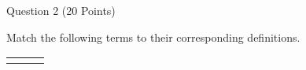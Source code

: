 \documentclass{article}
\begin{document}

\vspace{2cm}


\begin{minipage}{\textwidth}
    \noindent
    Question 2 (20 Points)
    \vspace{0.5cm}

    \noindent
    Match the following terms to their corresponding definitions.

    \vspace{0.5cm}

    \begin{center}
        \begin{tabular}{ l c l }

            \vspace{0.2cm}


\end{tabular}
\end{center}
\end{minipage}
\end{document}
